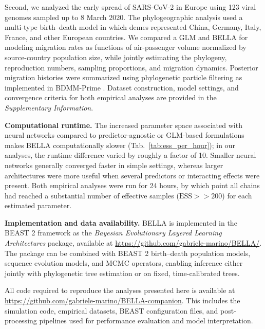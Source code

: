 Second, we analyzed the early spread of SARS-CoV-2 in Europe using 123 viral genomes sampled up to 8 March 2020. The phylogeographic analysis used a multi-type birth--death model in which demes represented China, Germany, Italy, France, and other European countries. We compared a GLM and BELLA for modeling migration rates as functions of air-passenger volume normalized by source-country population size, while jointly estimating the phylogeny, reproduction numbers, sampling proportions, and migration dynamics. Posterior migration histories were summarized using phylogenetic particle filtering as implemented in BDMM-Prime \citep{vaughan2019estimating,Vaughan2025BDMM}. Dataset construction, model settings, and convergence criteria for both empirical analyses are provided in the \textit{Supplementary Information}.

\noindent\textbf{Computational runtime.} The increased parameter space associated with neural networks compared to predictor-agnostic or GLM-based formulations makes BELLA computationally slower (Tab.~\ref{tab:ess_per_hour}); in our analyses, the runtime difference varied by roughly a factor of 10.
Smaller neural networks generally converged faster in simple settings, whereas larger architectures were more useful when several predictors or interacting effects were present.
Both empirical analyses were run for 24 hours, by which point all chains had reached a substantial number of effective samples ($\text{ESS} >> 200$) for each estimated parameter.

\noindent\textbf{Implementation and data availability.} BELLA is implemented in the BEAST 2 framework \citep{bouckaert2019beast} as the \textit{Bayesian Evolutionary Layered Learning Architectures} package, available at \url{https://github.com/gabriele-marino/BELLA/}.
The package can be combined with BEAST 2 birth--death population models, sequence evolution models, and MCMC operators, enabling inference either jointly with phylogenetic tree estimation or on fixed, time-calibrated trees.

All code required to reproduce the analyses presented here is available at \url{https://github.com/gabriele-marino/BELLA-companion}. This includes the simulation code, empirical datasets, BEAST configuration files, and post-processing pipelines used for performance evaluation and model interpretation.
